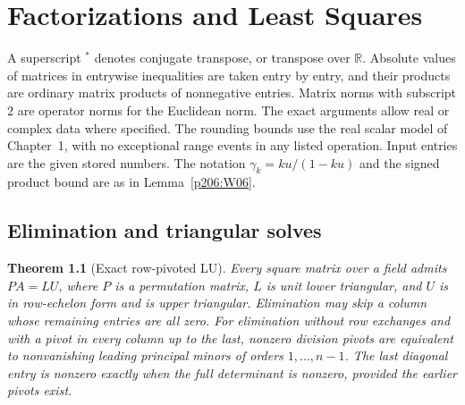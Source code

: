 \documentclass[11pt,oneside,openany]{book}
\theoremstyle{plain}
\newtheorem{theorem}{Theorem}[chapter]
\theoremstyle{definition}
\theoremstyle{remark}
\begin{document}
\chapter{Factorizations and Least Squares}
\label{p206:factorizations}

A superscript \(^{*}\) denotes conjugate transpose, or transpose over
\(\mathbb R\). Absolute values of matrices in entrywise inequalities
are taken entry by entry, and their products are ordinary matrix
products of nonnegative entries. Matrix norms with subscript \(2\)
are operator norms for the Euclidean norm. The exact arguments
allow real or complex data where specified. The rounding bounds
use the real scalar model of Chapter~1, with no exceptional range
events in any listed operation. Input entries are the given stored
numbers. The notation \(\gamma_k=ku/(1-ku)\) and the signed product
bound are as in Lemma~\ref{p206:W06}.

\section{Elimination and triangular solves}

\begin{theorem}[Exact row-pivoted LU]\label{p206:W20}
Every square matrix over a field admits \(PA=LU\), where \(P\) is a
permutation matrix, \(L\) is unit lower triangular, and \(U\) is in
row-echelon form and is upper triangular. Elimination may skip
a column whose remaining entries are all zero.
For elimination without row exchanges and with a pivot in every
column up to the last, nonzero division pivots are equivalent to
nonvanishing leading principal minors of orders \(1,\ldots,n-1\).
The last diagonal entry is nonzero exactly when the full determinant
is nonzero, provided the earlier pivots exist.
\end{theorem}
\end{document}
